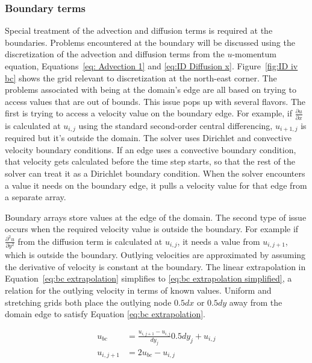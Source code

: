 \subsubsection{Boundary terms}
\label{sec:ID NS boundary}
Special treatment of the advection and diffusion terms is required at the boundaries. 
Problems encountered at the boundary will be discussed using the discretization of the advection and diffusion terms from the $u$-momentum equation, Equations~\eqref{eq: Advection 1} and \eqref{eq:ID Diffusion x}.
Figure~\ref{fig:ID iv bc} shows the grid relevant to discretization at the north-east corner. 
The problems associated with being at the domain's edge are all based on trying to access values that are out of bounds. 
This issue pops up with several flavors. 
The first is trying to access a velocity value on the boundary edge. 
For example, if $\frac{\partial u}{\partial x}$ is calculated at $u_{i,j}$ using the standard second-order central differencing, $u_{i+1,j}$ is required but it's outside the domain. 
The solver uses Dirichlet and convective velocity boundary conditions. 
If an edge uses a convective boundary condition, that velocity gets calculated before the time step starts, so that the rest of the solver can treat it as a Dirichlet boundary condition. 
When the solver encounters a value it needs on the boundary edge, it pulls a velocity value for that edge from a separate array. 

Boundary arrays store values at the edge of the domain. 
The second type of issue occurs when the required velocity value is outside the boundary. 
For example if $\frac{\partial^2 u}{\partial y^2}$ from the diffusion term is calculated at $u_{i,j}$, it needs a value from $u_{i,j+1}$, which is outside the boundary. 
Outlying velocities are approximated by assuming the derivative of velocity is constant at the boundary. 
The linear extrapolation in Equation~\eqref{eq:bc extrapolation} simplifies to \eqref{eq:bc extrapolation simplified}, a relation for the outlying velocity in terms of known values. 
Uniform and stretching grids both place the outlying node $0.5dx$ or $0.5dy$ away from the domain edge to satisfy Equation \eqref{eq:bc extrapolation}. 

\begin{align}
u_{bc} &= \frac{u_{i,j+1} - u_{i,j}}{dy_j}0.5dy_j+ u_{i,j} \label{eq:bc extrapolation} \\
u_{i,j+1} &= 2u_{bc} - u_{i,j} \; \label{eq:bc extrapolation simplified}
\end{align}


